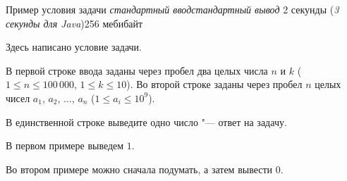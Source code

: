 \begin{problem}{Пример условия задачи}
{\textsl{стандартный ввод}}{\textsl{стандартный вывод}}
{2 секунды (\textsl{3 секунды для Java})}{256 мебибайт}{}

Здесь написано условие задачи.

\InputFile

В первой строке ввода заданы через пробел два целых числа $n$ и $k$
($1 \le n \le 100\,000$, $1 \le k \le 10$).
Во второй строке заданы через пробел $n$ целых чисел
$a_1$, $a_2$, $\ldots$, $a_n$
($1 \le a_i \le 10^9$).

\OutputFile

В единственной строке выведите одно число "--- ответ на задачу.

\Examples

\begin{example}
%
%
\end{example}

\Explanations

В первом примере выведем $1$.

Во втором примере можно сначала подумать, а затем вывести $0$.

\end{problem}
